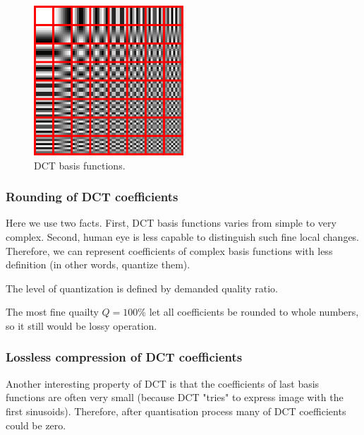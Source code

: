 \begin{figure}
\centerline{\includegraphics[width=0.5\textwidth]{images/Dctjpeg.png}}
\caption[DCT basis functions (Public domain) (source: \protect\url{https://en.wikipedia.org/wiki/File:Dctjpeg.png})]{DCT basis functions.}
\label{img:DCTbf}
\end{figure}



\subsubsection{Rounding of DCT coefficients}

Here we use two facts. First, DCT basis functions varies from simple
to very complex. Second, human eye is less capable to distinguish such
fine local changes. Therefore, we can represent coefficients of complex
basis functions with less definition (in other words, quantize them).

The level of quantization is defined by demanded quality ratio.

The most fine quailty $Q=100\%$ let all coefficients be rounded to whole numbers,
so it still would be lossy operation.

\subsubsection{Lossless compression of DCT coefficients}

Another interesting property of DCT is that the coefficients
of last basis functions are often very small (because DCT "tries"
to express image with the first sinusoids). Therefore, after
quantisation process many of DCT coefficients could be zero.

